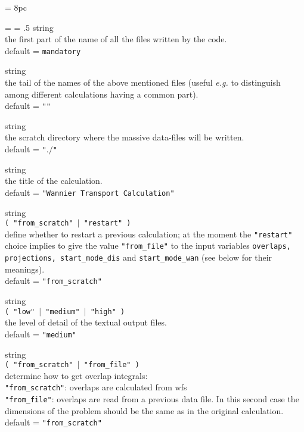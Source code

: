 \newdimen\descindent \descindent = 8pc
{\noindent \leftskip = \descindent \parskip = .5\baselineskip
{}%
{\sc string} \\ the first part of the name of all the files written by
the code.\\ {\sc default} = {\tt mandatory} \par

\noindent{}%
{\sc string} \\ the tail of the names of the above mentioned files (useful {\it e.g.} to
distinguish among different calculations having a common part).\\
{\sc default} = {\tt ""} \par

\noindent{}%
{\sc string} \\ the scratch directory where the massive data-files will be written.\\
{\sc default} = {\tt "$./$" }\par

\noindent{}%
{\sc string} \\ the title of the calculation.\\
{\sc default} = {\tt "Wannier Transport Calculation"} \par

\noindent{}%
{\sc string} \\ {\tt ( "from\_scratch" $\mid$ "restart" ) }\\
define whether to restart a previous calculation;
at the moment the {\tt "restart"} choice implies to give the value
{\tt "from\_file"} to the input
variables {\tt overlaps, projections,
start\_mode\_dis} and {\tt start\_mode\_wan}
(see below for their meanings).\\ {\sc default} = {\tt "from\_scratch"} \par

\noindent{}%
{\sc string} \\ {\tt ( "low" $\mid$ "medium" $\mid$ "high" ) }
\\the level of detail of the textual output files.\\
{\sc default} = {\tt "medium"} \par

\noindent{}%
{\sc string} \\ {\tt ( "from\_scratch" $\mid$ "from\_file" ) }\\
determine how to get overlap integrals:\\
{\tt "from\_scratch"}:  overlaps are calculated from wfs\\
{\tt "from\_file"}:     overlaps are read from a previous data file.
In this second case the dimensions of the problem should be the same as in the
original calculation.\\
{\sc default} = {\tt "from\_scratch"} \par

}
